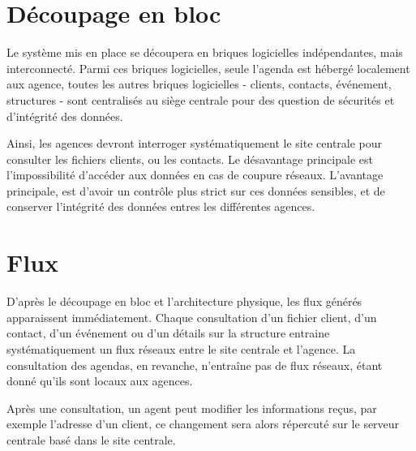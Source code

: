 \section{Découpage en bloc}
    
    Le système mis en place se découpera en briques logicielles indépendantes, mais interconnecté.
    Parmi ces briques logicielles, seule l'agenda est hébergé localement aux agence, toutes les autres briques logicielles - clients, contacts, événement, structures - sont centralisés au siège centrale pour des question de sécurités et d'intégrité des données.
    
    Ainsi, les agences devront interroger systématiquement le site centrale pour consulter les fichiers clients, ou les contacts.
    Le désavantage principale est l'impossibilité d'accéder aux données en cas de coupure réseaux.
    L'avantage principale, est d'avoir un contrôle plus strict sur ces données sensibles, et de conserver l'intégrité des données entres les différentes agences.
    
\section{Flux}

    D'après le découpage en bloc et l'architecture physique, les flux générés apparaissent immédiatement.
    Chaque consultation d'un fichier client, d'un contact, d'un événement ou d'un détails sur la structure entraine systématiquement un flux réseaux entre le site centrale et l'agence.
    La consultation des agendas, en revanche, n'entraîne pas de flux réseaux, étant donné qu'ils sont locaux aux agences.
    
    Après une consultation, un agent peut modifier les informations reçus, par exemple l'adresse d'un client, ce changement sera alors répercuté sur le serveur centrale basé dans le site centrale.
